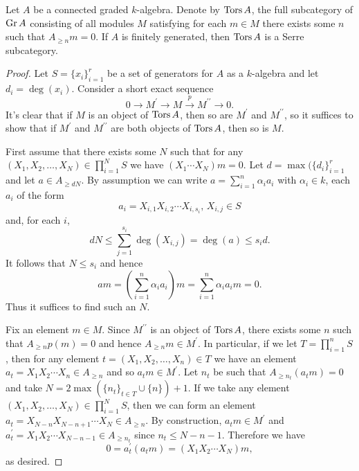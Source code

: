 \begin{proposition}\label{proposition: f.g. torsion}
  Let \(A\) be a connected graded \(k\)-algebra.
  Denote by \(\operatorname{Tors}A\), the full subcategory of \(\operatorname{Gr}A\) consisting of all modules \(M\) satisfying for each \(m \in M\) there exists some \(n\) such that \(A_{\geq n}m = 0\).
  If \(A\) is finitely generated, then \(\operatorname{Tors}A\) is a Serre subcategory.
\end{proposition}

\begin{proof}
  Let \(S = \{x_i\}_{i=1}^r\) be a set of generators for \(A\) as a \(k\)-algebra and let \(d_i = \deg(x_i)\).
  Consider a short exact sequence
  \[0 \to M^\prime \to M \overset{p}\to M^{\prime\prime} \to 0.\]
  It's clear that if \(M\) is an object of \(\operatorname{Tors}A\), then so are \(M^\prime\) and \(M^{\prime\prime}\), so it suffices to show that if \(M^\prime\) and \(M^{\prime\prime}\) are both objects of \(\operatorname{Tors}A\), then so is \(M\).
  
  First assume that there exists some \(N\) such that for any \((X_1, X_2, \ldots, X_N) \in \prod_{i = 1}^N S\) we have \((X_1 \cdots X_N)m = 0\).
  Let \(d = \max(\{d_i\}_{i = 1}^r\) and let \(a \in A_{\geq dN}\).
  By assumption we can write \(a = \sum_{i=1}^n \alpha_i a_i\) with \(\alpha_i \in k\), each \(a_i\) of the form
  \[a_i = X_{i,1} X_{i,2}\cdots X_{i, s_i},\, X_{i,j} \in S\]
  and, for each \(i\),
  \[dN \leq \sum_{j = 1}^{s_i} \deg(X_{i,j}) = \deg(a) \leq s_i d.\]
  It follows that \(N \leq s_i\) and hence
  \[am = \left(\sum_{i = 1}^n \alpha_i a_i\right) m = \sum_{i = 1}^n \alpha_i a_i m = 0.\]
  Thus it suffices to find such an \(N\).

  Fix an element \(m \in M\).
  Since \(M^{\prime\prime}\) is an object of \(\operatorname{Tors}A\), there exists some \(n\) such that \(A_{\geq n} p(m) = 0\) and hence \(A_{\geq n}m \in M^\prime\).
  In particular, if we let \(T = \prod_{i = 1}^n S\), then for any element \(t = (X_1, X_2, \ldots, X_n) \in T\) we have an element \(a_t = X_1 X_2 \cdots X_n \in A_{\geq n}\) and so \(a_t m \in M^\prime\).
  Let \(n_t\) be such that \(A_{\geq n_t} (a_t m) = 0\) and take \(N = 2\max(\{n_t\}_{t \in T} \cup \{n\}) + 1\).
  If we take any element \((X_1, X_2, \ldots, X_N) \in \prod_{i = 1}^N S\), then we can form an element \(a_t = X_{N - n} X_{N - n + 1} \cdots X_N \in A_{\geq n}\).
  By construction, \(a_t m \in M^\prime\) and \(a_t^\prime = X_1 X_2 \cdots X_{N - n - 1} \in A_{\geq n_t}\) since \(n_t \leq N - n - 1\).
  Therefore we have
  \[0 = a_t^\prime (a_t m) = (X_1 X_2 \cdots X_N) m,\]
  as desired.
\end{proof}


